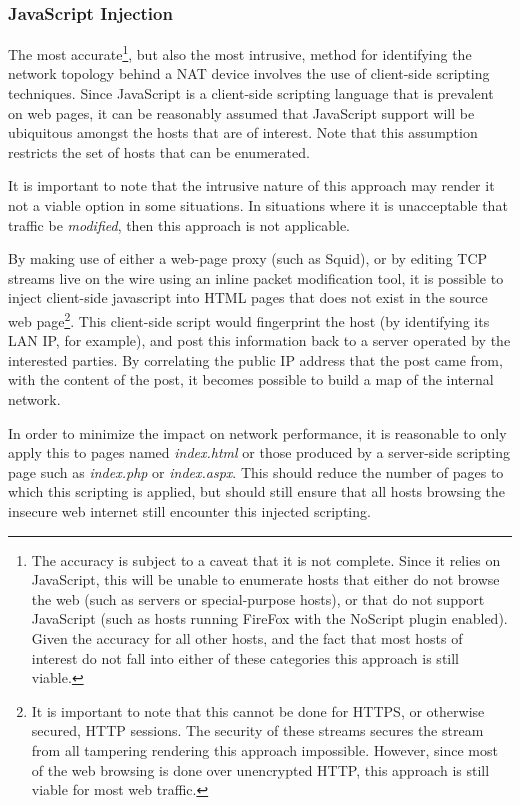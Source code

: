 \documentclass{article}
\theoremstyle{remark}
\theoremstyle{definition}
\theoremstyle{definition}
\theoremstyle{definition}
\begin{document}
\subsubsection{JavaScript Injection}
\label{nat-js}
The most accurate\footnote{The accuracy is subject to a caveat that it is not complete. Since it relies on JavaScript, this will be unable to enumerate hosts that either do not browse the web (such as servers or special-purpose hosts), or that do not support JavaScript (such as hosts running FireFox with the NoScript plugin enabled). Given the accuracy for all other hosts, and the fact that most hosts of interest do not fall into either of these categories this approach is still viable.}, but also the most intrusive, method for identifying the network topology behind a NAT device involves the use of client-side scripting techniques. Since JavaScript is a client-side scripting language that is prevalent on web pages, it can be reasonably assumed that JavaScript support will be ubiquitous amongst the hosts that are of interest. Note that this assumption restricts the set of hosts that can be enumerated.

It is important to note that the intrusive nature of this approach may render it not a viable option in some situations. In situations where it is unacceptable that traffic be \emph{modified}, then this approach is not applicable.

By making use of either a web-page proxy (such as Squid), or by editing TCP streams live on the wire using an inline packet modification tool, it is possible to inject client-side javascript into HTML pages that does not exist in the source web page\footnote{It is important to note that this cannot be done for HTTPS, or otherwise secured, HTTP sessions. The security of these streams secures the stream from all tampering rendering this approach impossible. However, since most of the web browsing is done over unencrypted HTTP, this approach is still viable for most web traffic.}. This client-side script would fingerprint the host (by identifying its LAN IP, for example), and post this information back to a server operated by the interested parties. By correlating the public IP address that the post came from, with the content of the post, it becomes possible to build a map of the internal network.

In order to minimize the impact on network performance, it is reasonable to only apply this to pages named \emph{index.html} or those produced by a server-side scripting page such as \emph{index.php} or \emph{index.aspx}. This should reduce the number of pages to which this scripting is applied, but should still ensure that all hosts browsing the insecure web internet still encounter this injected scripting.
\end{document}
